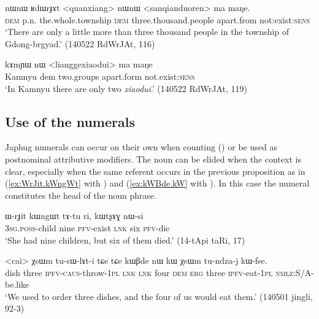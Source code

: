 \begin{exe}
\ex \label{ex:quanxiang}
 \gll nɯnɯ ʁdɯrɟɤt <quanxiang> nɯnɯ <sanqianduoren> ma maŋe. \\
 \textsc{dem} p.n. the.whole.township \textsc{dem} three.thousand.people apart.from not:exist:\textsc{sens} \\
 \glt  `There are only a little more than three thousand people in the township of Gdong-brgyad.' (140522 RdWrJAt, 116)
 \end{exe}
 
\begin{exe}
\ex \label{ex:liangge}
 \gll  kɤmɲɯ nɯ <lianggexiaodui> ma maŋe \\
 Kamnyu dem two.groups apart.form not.exist:\textsc{sens} \\
\glt `In Kamnyu there are only two \textit{xiaodui}.' (140522 RdWrJAt, 119)
 \end{exe} 
 \subsection{Use of the numerals}  \label{sec:uses.numerals}
 Japhug numerals can occur on their own when counting () or be used as postnominal attributive modifiers. The noun can be elided when the context is clear, especially when the same referent occurs in the previous proposition as in (\ref{ex:WrJit.kWngWt}  with ) and (\ref{ex:kWBde.kW} with ). In this case the numeral constitutes the head of the noun phrase.

\begin{exe}
\ex \label{ex:WrJit.kWngWt} 
\gll
ɯ-rɟit kɯngɯt tɤ-tu ri, kɯtʂɤɣ nɯ-si \\
\textsc{3sg.poss}-child nine \textsc{pfv}-exist \textsc{lnk} six \textsc{pfv}-die \\
\glt `She had nine children, but six of them died.' (14-tApi taRi, 17)
\end{exe}

\begin{exe}
\ex \label{ex:kWBde.kW} 
\gll <cai> χsɯm tu-sɯ-lɤt-i tɕe tɕe  kɯβde nɯ kɯ χsɯm tu-ndza-j kɯ-fse. \\
dish three \textsc{ipfv}-\textsc{caus}-throw-\textsc{1pl} \textsc{lnk} \textsc{lnk} four \textsc{dem} \textsc{erg} three \textsc{ipfv}-eat-\textsc{1pl} \textsc{nmlz}:S/A-be.like \\
\glt `We used to order three dishes, and the four of us would eat them.' (140501 jingli, 92-3)
\end{exe}		


